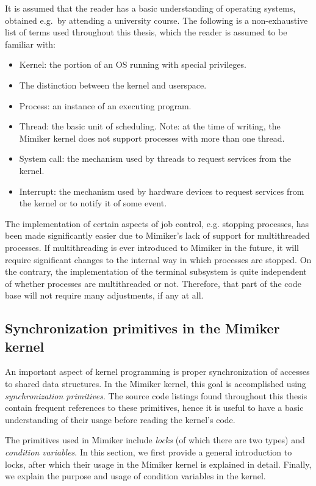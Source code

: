 \documentclass[shortabstract, manyadvisors, english, mgr]{iithesis}
\begin{document}
It is assumed that the reader has a basic understanding of operating systems,
obtained e.g.\ by attending a university course. The following is a
non-exhaustive list of terms used throughout this thesis, which the reader is
assumed to be familiar with:
\begin{itemize}
  \item Kernel: the portion of an OS running with special privileges.
  \item The distinction between the kernel and userspace.
  \item Process: an instance of an executing program.
  \item Thread: the basic unit of scheduling. Note: at the time of writing, the
    Mimiker kernel does not support processes with more than one thread.
  \item System call: the mechanism used by threads to request services from the
    kernel.
  \item Interrupt: the mechanism used by hardware devices to request services
    from the kernel or to notify it of some event.
\end{itemize}

The implementation of certain aspects of job control, e.g. stopping processes,
has been made significantly easier due to Mimiker's lack of support for
multithreaded processes. If multithreading is ever introduced to Mimiker in the
future, it will require significant changes to the internal way in which
processes are stopped. On the contrary, the implementation of the terminal
subsystem is quite independent of whether processes are multithreaded or not.
Therefore, that part of the code base will not require many adjustments, if any
at all.

\subsection{Synchronization primitives in the Mimiker
  kernel}\label{chap:locking-intro}

An important aspect of kernel programming is proper synchronization of accesses
to shared data structures. In the Mimiker kernel, this goal is accomplished
using \textit{synchronization primitives}. The source code listings found
throughout this thesis contain frequent references to these primitives, hence it
is useful to have a basic understanding of their usage before reading the kernel's
code.

The primitives used in Mimiker include \textit{locks} (of which there are two
types) and \textit{condition variables}. In this section, we first provide a
general introduction to locks, after which their usage in the Mimiker kernel is
explained in detail. Finally, we explain the purpose and usage of condition
variables in the kernel.
\end{document}
